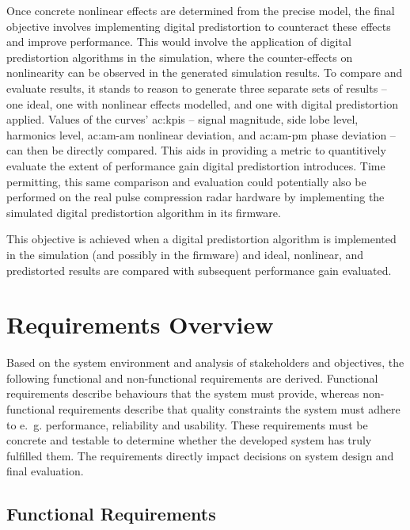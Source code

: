 Once concrete nonlinear effects are determined from the precise model, the final objective involves implementing digital predistortion to counteract these effects and improve performance. This would involve the application of digital predistortion algorithms in the simulation, where the counter-effects on nonlinearity can be observed in the generated simulation results. To compare and evaluate results, it stands to reason to generate three separate sets of results – one ideal, one with nonlinear effects modelled, and one with digital predistortion applied. Values of the curves’ \glspl{ac:kpi} – signal magnitude, side lobe level, harmonics level, \gls{ac:am-am} nonlinear deviation, and \gls{ac:am-pm} phase deviation – can then be directly compared. This aids in providing a metric to quantitively evaluate the extent of performance gain digital predistortion introduces. Time permitting, this same comparison and evaluation could potentially also be performed on the real pulse compression radar hardware by implementing the simulated digital predistortion algorithm in its firmware.

This objective is achieved when a digital predistortion algorithm is implemented in the simulation (and possibly in the firmware) and ideal, nonlinear, and predistorted results are compared with subsequent performance gain evaluated.  

\section{Requirements Overview}\label{sec:reqs_overview}

Based on the system environment and analysis of stakeholders and objectives, the following functional and non-functional requirements are derived. Functional requirements describe behaviours that the system must provide, whereas non-functional requirements describe that quality constraints the system must adhere to e.~g. performance, reliability and usability. These requirements must be concrete and testable to determine whether the developed system has truly fulfilled them. The requirements directly impact decisions on system design and final evaluation.

\subsection{Functional Requirements}

